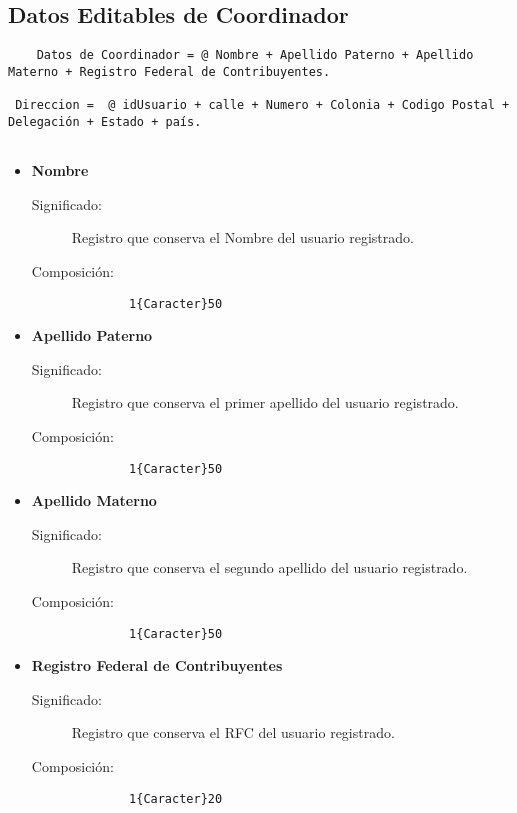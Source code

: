 \subsection{Datos Editables de Coordinador}\label{dd:DatosEditablesCoordinador}
\begin{lstlisting}
	Datos de Coordinador = @ Nombre + Apellido Paterno + Apellido Materno + Registro Federal de Contribuyentes.
  
 Direccion =  @ idUsuario + calle + Numero + Colonia + Codigo Postal + Delegación + Estado + país.
 
\end{lstlisting}
\begin{itemize}
 
 \item \textbf{Nombre}\label{dd:nombreC}
    \begin{description}
      \item [Significado:] Registro que conserva el Nombre del usuario registrado.
      \item [Composición:]{\begin{lstlisting}
        1{Caracter}50\end{lstlisting}}
    \end{description}

  \item \textbf{Apellido Paterno}\label{dd:apPatC}
    \begin{description}
      \item [Significado:] Registro que conserva el primer apellido del usuario registrado.
      \item [Composición:]{\begin{lstlisting}
        1{Caracter}50\end{lstlisting}}
    \end{description}

  \item \textbf{Apellido Materno}\label{dd:apMatC}
    \begin{description}
      \item [Significado:] Registro que conserva el segundo apellido del usuario registrado.
      \item [Composición:]{\begin{lstlisting}
        1{Caracter}50\end{lstlisting}}
    \end{description}

    \item \textbf{Registro Federal de Contribuyentes}\label{dd:rfcC}
    \begin{description}
      \item [Significado:] Registro que conserva el RFC del usuario registrado.
      \item [Composición:]{\begin{lstlisting}
        1{Caracter}20\end{lstlisting}}
    \end{description}


\end{itemize}

